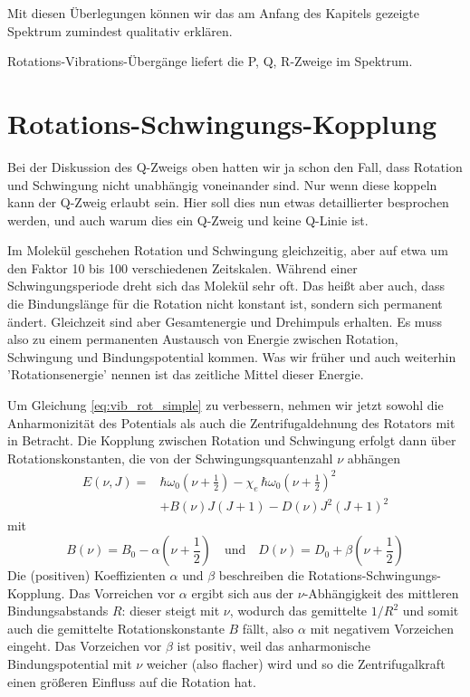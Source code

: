 Mit diesen Überlegungen können wir das am Anfang des Kapitels gezeigte Spektrum zumindest qualitativ erklären.


\begin{marginfigure}
\caption{Rotations-Vibrations-Übergänge liefert die P, Q, R-Zweige im Spektrum.}
\end{marginfigure}
 
 
\section{Rotations-Schwingungs-Kopplung}

Bei der Diskussion des Q-Zweigs oben hatten wir ja schon den Fall, dass Rotation und Schwingung nicht unabhängig voneinander sind. Nur wenn diese koppeln kann der Q-Zweig erlaubt sein. Hier soll dies nun etwas detaillierter besprochen werden, und auch warum dies ein Q-Zweig und keine Q-Linie ist.

Im Molekül geschehen Rotation und Schwingung gleichzeitig, aber auf etwa um den Faktor 10 bis 100 verschiedenen Zeitskalen. Während einer Schwingungsperiode dreht sich das Molekül sehr oft. Das heißt aber auch, dass die Bindungslänge für die Rotation nicht konstant ist, sondern sich permanent ändert. Gleichzeit sind aber Gesamtenergie und Drehimpuls erhalten. Es muss also zu einem permanenten Austausch von Energie zwischen Rotation, Schwingung und Bindungspotential kommen. Was wir früher und auch weiterhin 'Rotationsenergie' nennen ist das zeitliche Mittel dieser Energie.

Um Gleichung \ref{eq:vib_rot_simple} zu verbessern, nehmen wir jetzt sowohl die Anharmonizität des Potentials als auch die Zentrifugaldehnung des Rotators mit in Betracht. Die Kopplung zwischen Rotation und Schwingung erfolgt dann über Rotationskonstanten, die von der Schwingungsquantenzahl $\nu$ abhängen
\begin{align}
 E(\nu, J) = & \hbar \omega_0 \left( \nu  + \frac{1}{2} \right)
 - \chi_e \, \hbar \omega_0  \left( \nu  + \frac{1}{2} \right)^2 \\
 & + B(\nu) J (J+1) - D(\nu) J^2 (J+1)^2  \nonumber
\end{align}
mit
\begin{equation}
B(\nu) = B_0 - \alpha \left(\nu + \frac{1}{2} \right) \quad \text{und} \quad
D(\nu) = D_0 + \beta \left(\nu + \frac{1}{2} \right) 
\end{equation}
Die (positiven) Koeffizienten $\alpha$ und $\beta$ beschreiben die  Rotations-Schwingungs-Kopplung. Das Vorreichen vor $\alpha$ ergibt sich aus der $\nu$-Abhängigkeit des mittleren Bindungsabstands $R$: dieser steigt mit $\nu$, wodurch das gemittelte $1/R^2$ und somit auch die gemittelte Rotationskonstante $B$ fällt, also $\alpha$ mit negativem Vorzeichen eingeht. Das Vorzeichen vor $\beta$ ist positiv, weil das anharmonische Bindungspotential mit $\nu$ weicher (also flacher) wird und so die Zentrifugalkraft einen größeren Einfluss auf die Rotation hat.

